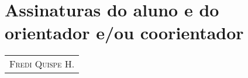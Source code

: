 \documentclass[a4paper, 11pt]{article}
\begin{document}
\section{Assinaturas do aluno e do orientador e/ou coorientador}

\newpage

 
\vfill \hfill
\begin{tabular}{c}

\\ \hline
\textsc{Fredi Quispe H.}
\end{tabular}
\end{document}
